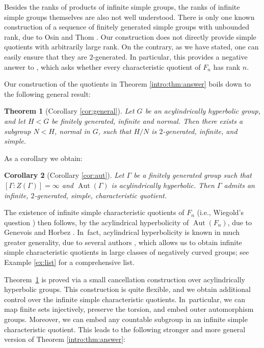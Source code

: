 \documentclass[JEP,XML,SOM,Unicode]{cedram}
\newtheorem{theorem}{Theorem}[section]
\newtheorem{corollary}[theorem]{Corollary}
\theoremstyle{definition}
\newcommand{\Aut}{\operatorname{Aut}}
\begin{document}
Besides the ranks of products of infinite simple groups, the ranks of infinite simple groups themselves are also not well understood. There is only one known construction of a sequence of finitely generated simple groups with unbounded rank, due to Osin and Thom \cite{osinthom}.
Our construction does not directly provide simple quotients with arbitrarily large rank.
On the contrary, as we have stated, one can easily ensure that they are $2$-generated.
In particular, this provides a negative answer to \cite[Quest.\,17.62]{kourovka}, which asks whether every characteristic quotient of $F_n$ has rank $n$.

Our construction of the quotients in Theorem \ref{intro:thm:answer} boils down to the following general result:

\begin{theorem}[Corollary \ref{cor:general}]
\label{intro:thm:general}
Let $G$ be an acylindrically hyperbolic group, and let $H < G$ be finitely generated, infinite and normal. Then there exists a subgroup $N < H$, normal in $G$, such that $H/N$ is $2$-generated, infinite, and simple.
\end{theorem}

As a corollary we obtain:

\begin{corollary}[Corollary \ref{cor:aut}]
\label{intro:cor:aut}
Let $\Gamma$ be a finitely generated group such that \hbox{$[\Gamma : Z(\Gamma)] = \infty$} and $\Aut(\Gamma)$ is acylindrically hyperbolic. Then $\Gamma$ admits an infinite, $2$-generated, simple, characteristic quotient.
\end{corollary}

The existence of infinite simple characteristic quotients of $F_n$ (i.e., Wiegold's question \cite[Quest.\,6.45]{kourovka}) then follows, by the acylindrical hyperbolicity of $\Aut(F_n)$, due to Genevois and Horbez \cite{auto:infend}. In~fact, acylindrical hyperbolicity is known in much greater generality, due to several authors \cite{auto:graph2, auto:graph1, auto:oneend, auto:infend, escalierhorbez, auto:artin}, which allows us to obtain infinite simple characteristic quotients in large classes of negatively curved groups; see Example \ref{ex:list} for a comprehensive list.

Theorem~\ref{intro:thm:general} is proved via a small cancellation construction over acylindrically hyperbolic groups. This construction is quite flexible, and we obtain additional control over the infinite simple characteristic quotients. In~particular, we can map finite sets injectively, preserve the torsion, and embed outer automorphism groups. Moreover, we can embed any countable subgroup in an infinite simple characteristic quotient. This leads to the following stronger and more general version of Theorem \ref{intro:thm:answer}:
\end{document}
